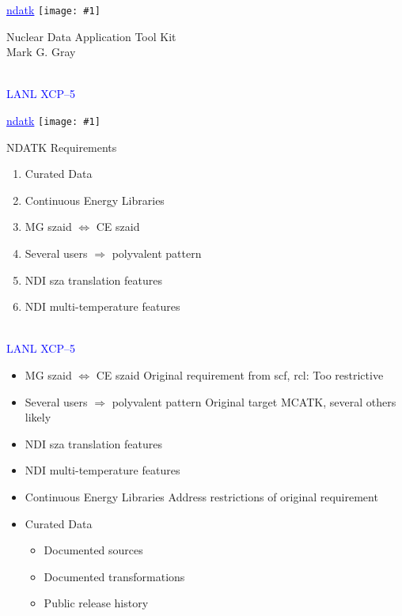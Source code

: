 \documentclass[clock]{slides}
\newenvironment{xslide}[1][logo.jpg]{\begin{slide} \tiny
\textcolor{blue}{\underline{ndatk}} \hfill
\texttt{[image: \#1]}
\normalsize}{\vfill\tiny
\textcolor{blue}{\hrulefill \\LANL XCP--5}
\end{slide}}
\begin{document}
\begin{xslide}

\begin{center}\Large
Nuclear Data Application Tool Kit\\
\vspace{2in}
Mark G. Gray\\ 
\end{center}

\end{xslide}

\begin{xslide}
\begin{center}\large
NDATK Requirements
\end{center}

\begin{enumerate}
\item Curated Data
\item Continuous Energy Libraries
\item MG szaid $\Leftrightarrow$ CE szaid
\item Several users $\Rightarrow$ polyvalent pattern
\item NDI sza translation features
\item NDI multi-temperature features
\end{enumerate}
\end{xslide}

\begin{note}\small
\begin{itemize}
\item MG szaid $\Leftrightarrow$ CE szaid
  Original requirement from scf, rcl: Too restrictive 
\item Several users $\Rightarrow$ polyvalent pattern
  Original target MCATK, several others likely
\item NDI sza translation features
\item NDI multi-temperature features
\end{itemize}

\begin{itemize}
\item Continuous Energy Libraries
  Address restrictions of original requirement
\item Curated Data
  \begin{itemize}
    \item Documented sources
    \item Documented transformations
    \item Public release history
  \end{itemize}
\end{itemize}
\end{note}
\end{document}
